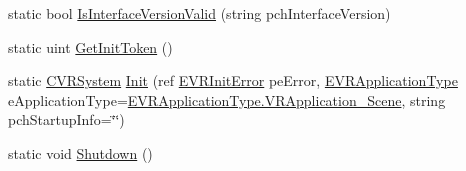 \begin{DoxyCompactItemize}
\item 
static bool \mbox{\hyperlink{class_valve_1_1_v_r_1_1_open_v_r_ab0838779108201f20567fb3bf8d8050d}{Is\+Interface\+Version\+Valid}} (string pch\+Interface\+Version)
\item 
static uint \mbox{\hyperlink{class_valve_1_1_v_r_1_1_open_v_r_a54472419f4502be686be5fddc8a69eb9}{Get\+Init\+Token}} ()
\item 
static \mbox{\hyperlink{class_valve_1_1_v_r_1_1_c_v_r_system}{C\+V\+R\+System}} \mbox{\hyperlink{class_valve_1_1_v_r_1_1_open_v_r_a9984a6ebb99fb582a11d5ada0b8af27c}{Init}} (ref \mbox{\hyperlink{namespace_valve_1_1_v_r_a5d8a20b60549ae5b7668d73452c7e83e}{E\+V\+R\+Init\+Error}} pe\+Error, \mbox{\hyperlink{namespace_valve_1_1_v_r_a75c95b1b332a3c064198f2eac92ffe07}{E\+V\+R\+Application\+Type}} e\+Application\+Type=\mbox{\hyperlink{namespace_valve_1_1_v_r_a75c95b1b332a3c064198f2eac92ffe07a112ddda5e69d20e2c68d17d672fda8b5}{E\+V\+R\+Application\+Type.\+V\+R\+Application\+\_\+\+Scene}}, string pch\+Startup\+Info=\char`\"{}\char`\"{})
\item 
static void \mbox{\hyperlink{class_valve_1_1_v_r_1_1_open_v_r_ad6faa1cc3961054643901552c4ab17ba}{Shutdown}} ()
\end{DoxyCompactItemize}
